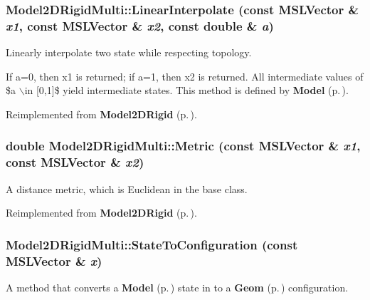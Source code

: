 \subsubsection{ Model2DRigid\-Multi::Linear\-Interpolate (const {\bf MSLVector} \& {\em x1}, const {\bf MSLVector} \& {\em x2}, const double \& {\em a})\hspace{0.3cm}{\tt  [virtual]}}\label{classModel2DRigidMulti_a4}


Linearly interpolate two state while respecting topology.

If a=0, then x1 is returned; if a=1, then x2 is returned. All intermediate values of \$a $\backslash$in [0,1]\$ yield intermediate states. This method is defined by {\bf Model} {\rm (p.\,\pageref{classModel})}. 

Reimplemented from {\bf Model2DRigid} {\rm (p.\,\pageref{classModel2DRigid_a4})}.
\subsubsection{\setlength{\rightskip}{0pt plus 5cm}double Model2DRigid\-Multi::Metric (const {\bf MSLVector} \& {\em x1}, const {\bf MSLVector} \& {\em x2})\hspace{0.3cm}{\tt  [virtual]}}\label{classModel2DRigidMulti_a2}


A distance metric, which is Euclidean in the base class.



Reimplemented from {\bf Model2DRigid} {\rm (p.\,\pageref{classModel2DRigid_a5})}.
\subsubsection{ Model2DRigid\-Multi::State\-To\-Configuration (const {\bf MSLVector} \& {\em x})\hspace{0.3cm}{\tt  [virtual]}}\label{classModel2DRigidMulti_a3}


A method that converts a {\bf Model} {\rm (p.\,\pageref{classModel})} state in to a {\bf Geom} {\rm (p.\,\pageref{classGeom})} configuration.




